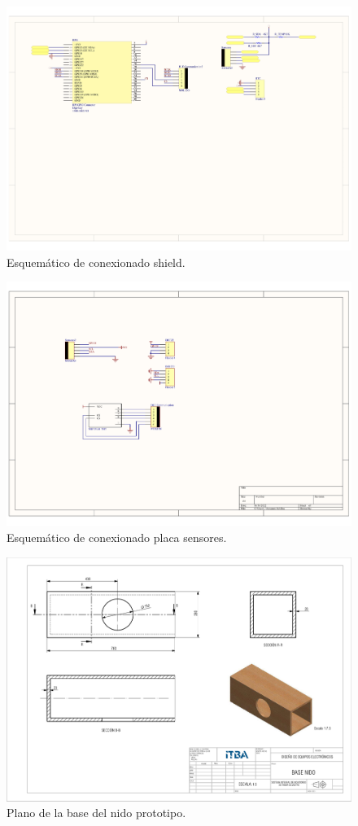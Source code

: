 
\begin{figure}[H]
	\centering
	\includegraphics[width=0.9\linewidth]{ImagenesApendice/esquematico}
	\caption{Esquemático de conexionado shield.}
	\label{fig:esquematico_conexionado_1}
\end{figure}
\begin{figure}[H]
	\centering
	\includegraphics[width=0.9\linewidth]{ImagenesApendice/esquematicoSensores}
	\caption{Esquemático de conexionado placa sensores.}
	\label{fig:esquematico_conexionado_2}
\end{figure}
\begin{figure}[H]
	\centering
	\includegraphics[width=\linewidth]{ImagenesApendice/Base_nido_plano}
	\caption{Plano de la base del nido prototipo.}
	\label{fig:base_nido_plano}
\end{figure}

